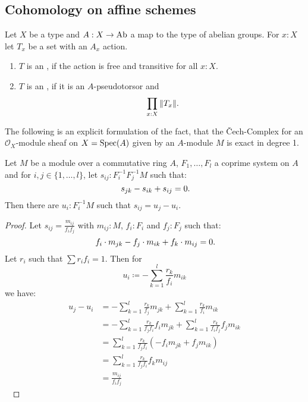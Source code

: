 \subsection{Cohomology on affine schemes}

\begin{definition}
  Let $X$ be a type and $A:X\to \operatorname{Ab}$ a map to the type of abelian groups.
  For $x:X$ let $T_x$ be a set with an $A_x$ action.
  \begin{enumerate}
  \item $T$ is an , if the action is free and transitive for all $x:X$.
  \item $T$ is an , if it is an $A$-pseudotorsor and
    \[ \prod_{x:X} \| T_x \| \rlap{.}\]
  \end{enumerate}
\end{definition}

The following is an explicit formulation of the fact, that the Čech-Complex for an
$\mathcal{O}_X$-module sheaf on $X=\operatorname{Spec}(A)$ given by an $A$-module $M$ is exact in degree 1.
\begin{lemma}%
  \label{lem:H1-algebra}
  Let $M$ be a module over a commutative ring $A$, $F_1,\dots,F_l$ a coprime system on $A$
  and for $i,j\in\{1,\dots,l\}$, let $s_{ij} : F_i^{-1} F_j^{-1} M$ such that:
  \[ s_{jk}-s_{ik}+s_{ij}=0 \rlap{.}\]
  Then there are $u_i:F_i^{-1}M$ such that $s_{ij}=u_j - u_i$.
\end{lemma}

\begin{proof}
  Let $s_{ij}=\frac{m_{ij}}{f_i f_j}$ with $m_{ij}:M$, $f_i:F_i$ and $f_j:F_j$ such that:
  \[ f_i\cdot m_{jk}-f_j\cdot m_{ik}+f_k\cdot m_{ij}=0 \rlap{.}\]
  Let $r_i$ such that $\sum r_i f_i =1$.
  Then for
  \[ u_i \coloneqq -\sum_{k=1}^l\frac{r_k}{f_i}m_{ik} \]
  we have:
  \begin{align*}
      u_j-u_i &= -\sum_{k=1}^l\frac{r_k}{f_j}m_{jk} + \sum_{k=1}^l\frac{r_k}{f_i}m_{ik} \\
              &= -\sum_{k=1}^l\frac{r_k}{f_j f_i}f_i m_{jk} + \sum_{k=1}^l\frac{r_k}{f_i f_j} f_j m_{ik} \\
              &= \sum_{k=1}^l\frac{r_k}{f_j f_i}(-f_i m_{jk} + f_j m_{ik}) \\
              &= \sum_{k=1}^l\frac{r_k}{f_j f_i}f_k m_{ij} \\
              &= \frac{m_{ij}}{f_i f_j}
  \end{align*}
  \ %
\end{proof}

